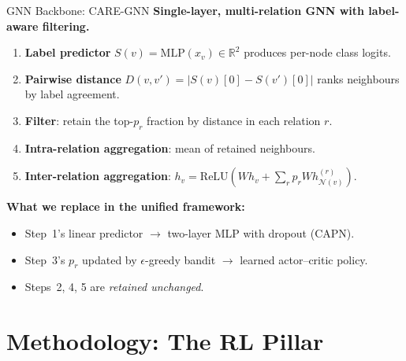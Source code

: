 \documentclass[aspectratio=169,10pt]{beamer}
\begin{document}
\begin{frame}{GNN Backbone: CARE-GNN}
    \textbf{Single-layer, multi-relation GNN with label-aware filtering.}
    \vspace{0.4em}
    \begin{enumerate}
        \item \textbf{Label predictor} $S(v) = \mathrm{MLP}(x_v) \in \mathbb{R}^2$
              produces per-node class logits.
        \item \textbf{Pairwise distance}
              $D(v, v') = |S(v)[0] - S(v')[0]|$ ranks neighbours by label agreement.
        \item \textbf{Filter}: retain the top-$p_r$ fraction by distance in each
              relation $r$.
        \item \textbf{Intra-relation aggregation}: mean of retained neighbours.
        \item \textbf{Inter-relation aggregation}:
              $h_v = \mathrm{ReLU}\!\left( W h_v + \sum_r p_r W h_{\mathcal{N}(v)}^{(r)} \right)$.
    \end{enumerate}
    \vspace{0.4em}
    \textbf{What we replace in the unified framework:}
    \begin{itemize}
        \item Step~1's linear predictor $\to$ two-layer MLP with dropout (CAPN).
        \item Step~3's $p_r$ updated by $\epsilon$-greedy bandit $\to$ learned actor--critic policy.
        \item Steps~2, 4, 5 are \emph{retained unchanged}.
    \end{itemize}
\end{frame}

\section{Methodology: The RL Pillar}
\end{document}
